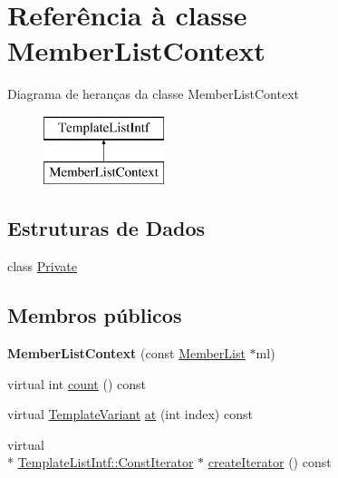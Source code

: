 \hypertarget{class_member_list_context}{\section{Referência à classe Member\-List\-Context}
\label{class_member_list_context}
}
Diagrama de heranças da classe Member\-List\-Context\begin{figure}[H]
\begin{center}
\leavevmode
\includegraphics[height=2.000000cm]{class_member_list_context}
\end{center}
\end{figure}
\subsection*{Estruturas de Dados}
\begin{DoxyCompactItemize}
\item 
class \hyperlink{class_member_list_context_1_1_private}{Private}
\end{DoxyCompactItemize}
\subsection*{Membros públicos}
\begin{DoxyCompactItemize}
\item 
\hypertarget{class_member_list_context_a1d465dd62e91bf13c517a02d8361a812}{{\bfseries Member\-List\-Context} (const \hyperlink{class_member_list}{Member\-List} $\ast$ml)}\label{class_member_list_context_a1d465dd62e91bf13c517a02d8361a812}

\item 
virtual int \hyperlink{class_member_list_context_a0745638c9967e2ed90bc96c012288c55}{count} () const 
\item 
virtual \hyperlink{class_template_variant}{Template\-Variant} \hyperlink{class_member_list_context_a55f90d50fcb1378b2a97b9c3ad5bb162}{at} (int index) const 
\item 
virtual \\*
\hyperlink{class_template_list_intf_1_1_const_iterator}{Template\-List\-Intf\-::\-Const\-Iterator} $\ast$ \hyperlink{class_member_list_context_a0b1d6dedc3f51750e5cba18f51022f10}{create\-Iterator} () const 
\end{DoxyCompactItemize}


